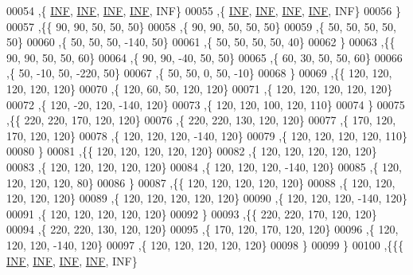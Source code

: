 \begin{DoxyCode}
00054   ,\{   \hyperlink{energy__const_8h_a12c2040f25d8e3a7b9e1c2024c618cb6}{INF},   \hyperlink{energy__const_8h_a12c2040f25d8e3a7b9e1c2024c618cb6}{INF},   \hyperlink{energy__const_8h_a12c2040f25d8e3a7b9e1c2024c618cb6}{INF},   \hyperlink{energy__const_8h_a12c2040f25d8e3a7b9e1c2024c618cb6}{INF},   INF\}
00055   ,\{   \hyperlink{energy__const_8h_a12c2040f25d8e3a7b9e1c2024c618cb6}{INF},   \hyperlink{energy__const_8h_a12c2040f25d8e3a7b9e1c2024c618cb6}{INF},   \hyperlink{energy__const_8h_a12c2040f25d8e3a7b9e1c2024c618cb6}{INF},   \hyperlink{energy__const_8h_a12c2040f25d8e3a7b9e1c2024c618cb6}{INF},   INF\}
00056   \}
00057  ,\{\{    90,    90,    50,    50,    50\}
00058   ,\{    90,    90,    50,    50,    50\}
00059   ,\{    50,    50,    50,    50,    50\}
00060   ,\{    50,    50,    50,  -140,    50\}
00061   ,\{    50,    50,    50,    50,    40\}
00062   \}
00063  ,\{\{    90,    90,    50,    50,    60\}
00064   ,\{    90,    90,   -40,    50,    50\}
00065   ,\{    60,    30,    50,    50,    60\}
00066   ,\{    50,   -10,    50,  -220,    50\}
00067   ,\{    50,    50,     0,    50,   -10\}
00068   \}
00069  ,\{\{   120,   120,   120,   120,   120\}
00070   ,\{   120,    60,    50,   120,   120\}
00071   ,\{   120,   120,   120,   120,   120\}
00072   ,\{   120,   -20,   120,  -140,   120\}
00073   ,\{   120,   120,   100,   120,   110\}
00074   \}
00075  ,\{\{   220,   220,   170,   120,   120\}
00076   ,\{   220,   220,   130,   120,   120\}
00077   ,\{   170,   120,   170,   120,   120\}
00078   ,\{   120,   120,   120,  -140,   120\}
00079   ,\{   120,   120,   120,   120,   110\}
00080   \}
00081  ,\{\{   120,   120,   120,   120,   120\}
00082   ,\{   120,   120,   120,   120,   120\}
00083   ,\{   120,   120,   120,   120,   120\}
00084   ,\{   120,   120,   120,  -140,   120\}
00085   ,\{   120,   120,   120,   120,    80\}
00086   \}
00087  ,\{\{   120,   120,   120,   120,   120\}
00088   ,\{   120,   120,   120,   120,   120\}
00089   ,\{   120,   120,   120,   120,   120\}
00090   ,\{   120,   120,   120,  -140,   120\}
00091   ,\{   120,   120,   120,   120,   120\}
00092   \}
00093  ,\{\{   220,   220,   170,   120,   120\}
00094   ,\{   220,   220,   130,   120,   120\}
00095   ,\{   170,   120,   170,   120,   120\}
00096   ,\{   120,   120,   120,  -140,   120\}
00097   ,\{   120,   120,   120,   120,   120\}
00098   \}
00099  \}
00100 ,\{\{\{   \hyperlink{energy__const_8h_a12c2040f25d8e3a7b9e1c2024c618cb6}{INF},   \hyperlink{energy__const_8h_a12c2040f25d8e3a7b9e1c2024c618cb6}{INF},   \hyperlink{energy__const_8h_a12c2040f25d8e3a7b9e1c2024c618cb6}{INF},   \hyperlink{energy__const_8h_a12c2040f25d8e3a7b9e1c2024c618cb6}{INF},   INF\}

\end{DoxyCode}
